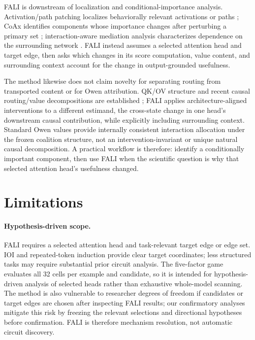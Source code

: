 FALI is downstream of localization and conditional-importance analysis. Activation/path patching localizes behaviorally relevant activations or paths \citep{goldowskydill2023pathpatching,zhang2024activationpatching,heimersheim2024activationpatching}; CoAx identifies components whose importance changes after perturbing a primary set \citep{gong2026coax}; interaction-aware mediation analysis characterizes dependence on the surrounding network \citep{vaidyanathan2026curse}. FALI instead assumes a selected attention head and target edge, then asks which changes in its score computation, value content, and surrounding context account for the change in output-grounded usefulness.

The method likewise does not claim novelty for separating routing from transported content or for Owen attribution. QK/OV structure and recent causal routing/value decompositions are established \citep{elhage2021mathematical,franco2025attentioncausal,wang2026fewshot}; FALI applies architecture-aligned interventions to a different estimand, the cross-state change in one head's downstream causal contribution, while explicitly including surrounding context. Standard Owen values provide internally consistent interaction allocation under the frozen coalition structure, not an intervention-invariant or unique natural causal decomposition. A practical workflow is therefore: identify a conditionally important component, then use FALI when the scientific question is why that selected attention head's usefulness changed.

\section{Limitations}\label{sec:limitations}

\paragraph{Hypothesis-driven scope.}
FALI requires a selected attention head and task-relevant target edge or edge set. IOI and repeated-token induction provide clear target coordinates; less structured tasks may require substantial prior circuit analysis. The five-factor game evaluates all 32 cells per example and candidate, so it is intended for hypothesis-driven analysis of selected heads rather than exhaustive whole-model scanning. The method is also vulnerable to researcher degrees of freedom if candidates or target edges are chosen after inspecting FALI results; our confirmatory analyses mitigate this risk by freezing the relevant selections and directional hypotheses before confirmation. FALI is therefore mechanism resolution, not automatic circuit discovery.


